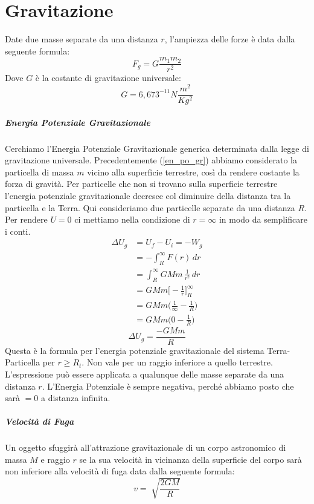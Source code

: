 \chapter{Gravitazione}

Date due masse separate da una distanza $r$, l'ampiezza delle forze è data 
dalla seguente formula:
\begin{equation}
    F_g = G\frac{m_1m_2}{r^2}
\end{equation}
Dove $G$ è la costante di gravitazione universale:
\begin{equation*}
    G = 6,673^{-11} N\frac{m^2}{Kg^2}
\end{equation*}
    
    \paragraph{Energia Potenziale Gravitazionale} Cerchiamo l'Energia 
    Potenziale Gravitazionale generica determinata dalla legge di gravitazione 
    universale. Precedentemente (\ref{en_po_gr}) abbiamo considerato la 
    particella di massa $m$ vicino alla superficie terrestre, così da rendere 
    costante la forza di gravità. Per particelle che non si trovano sulla 
    superficie terrestre l'energia potenziale gravitazionale decresce col 
    diminuire della distanza tra la particella e la Terra. Qui consideriamo 
    due particelle separate da una distanza $R$. Per rendere $U = 0$ ci 
    mettiamo nella condizione di $ r = \infty$ in modo da semplificare i conti.
    \begin{align*}
        \Delta U_g &= U_f - U_i = -W_g \\
        &= - \int_{R}^{\infty} F(r) \,dr \\
        &= \int_{R}^{\infty} GMm \, \frac{1}{r^2} \,dr \\
        &= GMm \bigg[-\frac{1}{r}\bigg]^{\infty}_{R} \\
        &= GMm\biggl(\frac{1}{\infty} - \frac{1}{R}\biggr) \\
        &= GMm\biggl(0 - \frac{1}{R}\biggr)
    \end{align*}
    \begin{equation}
        \Delta U_g = \frac{-GMm}{R}
    \end{equation}
    Questa è la formula per l'energia potenziale gravitazionale del sistema
    Terra-Particella per $r \geq R_t$. Non vale per un raggio inferiore a
    quello terrestre.
    L'espressione può essere applicata a qualunque delle masse separate da una
    distanza $r$. L'Energia Potenziale è sempre negativa, perché abbiamo posto
    che sarà $= 0$ a distanza infinita.

    \paragraph{Velocità di Fuga} Un oggetto sfuggirà all'attrazione 
    gravitazionale di un corpo astronomico di massa $M$ e raggio $r$ se la sua 
    velocità in vicinanza della superficie del corpo sarà non inferiore alla 
    velocità di fuga data dalla seguente formula:
        \begin{equation}
            v = \sqrt[]{\frac{2GM}{R}}
        \end{equation}